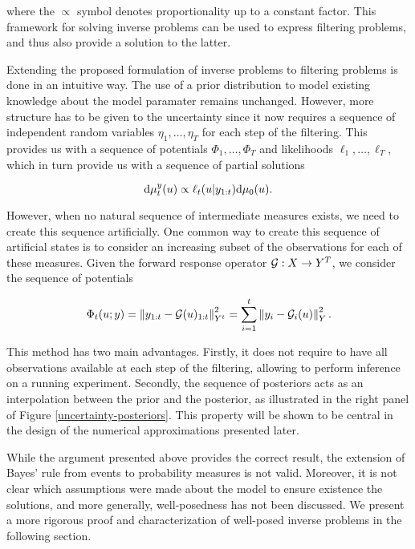 where the $\propto$ symbol denotes proportionality up to a constant factor. This framework for solving inverse problems can be used to express filtering problems, and thus also provide a solution to the latter. 

Extending the proposed formulation of inverse problems to filtering problems is done in an intuitive way. The use of a prior distribution to model existing knowledge about the model paramater remains unchanged. However, more structure has to be given to the uncertainty since it now requires a sequence of independent random variables $\eta_1, \ldots, \eta_T$ for each step of the filtering. This provides us with a sequence of potentials $\Phi_1, \ldots, \Phi_T$ and likelihoods $\ell_1, \ldots, \ell_T$, which in turn provide us with a sequence of partial solutions

\begin{equation*}
  \text{d}\mu_t^y(u) \propto \ell_t(u|y_{1:t})\text{d}\mu_0(u).
\end{equation*}

However, when no natural sequence of intermediate measures exists, we need to create this sequence artificially. One common way to create this sequence of artificial states is to consider an increasing subset of the observations for each of these measures. Given the forward response operator $\mathcal{G} : X \rightarrow Y^T$, we consider the sequence of potentials

\begin{equation}\label{phi-seq}
  \Phi_t(u; y) = \left\lVert y_{1:t} - \mathcal{G}(u)_{1:t}\right\rVert_{Y^t}^2 = \sum_{i=1}^t\left\lVert y_i - \mathcal{G}_i(u)\right\rVert_Y^2.
\end{equation}

This method has two main advantages. Firstly, it does not require to have all observations available at each step of the filtering, allowing to perform inference on a running experiment. Secondly, the sequence of posteriors acts as an interpolation between the prior and the posterior, as illustrated in the right panel of Figure \ref{uncertainty-posteriors}. This property will be shown to be central in the design of the numerical approximations presented later.

While the argument presented above provides the correct result, the extension of Bayes' rule from events to probability measures is not valid. Moreover, it is not clear which assumptions were made about the model to ensure existence the solutions, and more generally, well-posedness has not been discussed. We present a more rigorous proof and characterization of well-posed inverse problems in the following section.

